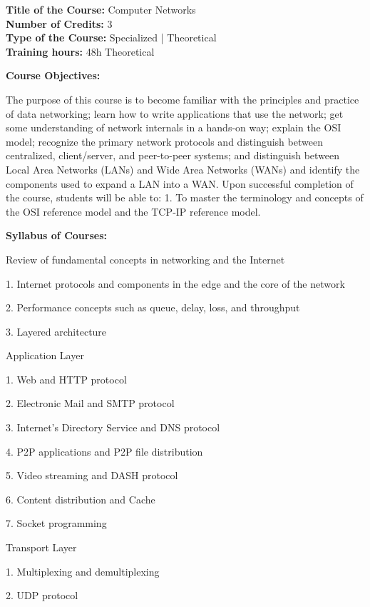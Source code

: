 \documentclass[12pt,a4paper]{article}
\begin{document}
\newpage
\textbf{Title of the Course:} Computer Networks\\
\textbf{Number of Credits:} 3\\
\textbf{Type of the Course:} Specialized | Theoretical\\
\textbf{Training hours:} 48h Theoretical\par\vspace{4pt}
\textbf{Course Objectives:}\par\vspace{2pt}
The purpose of this course is to become familiar with the principles and practice of data
networking; learn how to write applications that use the network; get some understanding of
network internals in a hands-on way; explain the OSI model; recognize the primary network
protocols and distinguish between centralized, client/server, and peer-to-peer systems; and
distinguish between Local Area Networks (LANs) and Wide Area Networks (WANs) and identify
the components used to expand a LAN into a WAN.
Upon successful completion of the course, students will be able to:
1. To master the terminology and concepts of the OSI reference model and the TCP‐IP reference
model.\par\vspace{4pt}
\textbf{Syllabus of Courses:}\par\vspace{2pt}
Review of fundamental concepts in networking and the Internet\par
1. Internet protocols and components in the edge and the core of the network\par
2. Performance concepts such as queue, delay, loss, and throughput\par
3. Layered architecture\par
Application Layer\par
1. Web and HTTP protocol\par
2. Electronic Mail and SMTP protocol\par
3. Internet’s Directory Service and DNS protocol\par
4. P2P applications and P2P file distribution\par
5. Video streaming and DASH protocol\par
6. Content distribution and Cache\par
7. Socket programming\par
Transport Layer\par
1. Multiplexing and demultiplexing\par
2. UDP protocol\par
\end{document}
